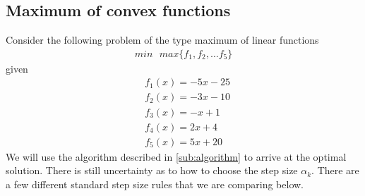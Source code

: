 \documentclass[twoside,twocolumn]{article}
\newcommand\fourspace{\,\,\,\,}
\begin{document}
\subsection{Maximum of convex functions}\label{sub:maxofconvex}
Consider the following problem of the type maximum of linear functions
\begin{align}
    min\fourspace max\{f_1,f_2,\dots f_5\}
\end{align}
given
\begin{align}
    &f_1(x) = -5x-25\nonumber\\
    &f_2(x) = -3x-10\nonumber\\
    &f_3(x) = -x+1 \nonumber\\
    &f_4(x) = 2x+4\nonumber\\
    &f_5(x) = 5x+20 \nonumber
\end{align}
We will use the algorithm described in \eqref{sub:algorithm} to arrive at the optimal solution. There is still uncertainty as to how to choose the step size $\alpha_k$. There are a few different standard step size rules that we are comparing below.
\end{document}
